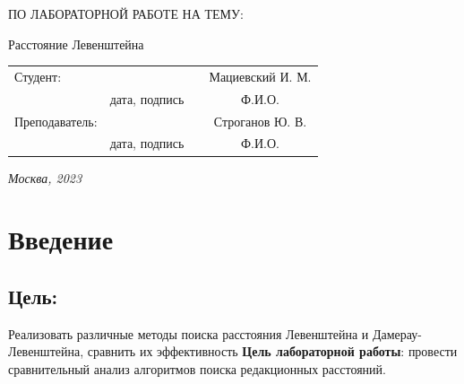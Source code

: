 \documentclass[12pt, a4paper]{article}
\begin{document}
\begin{titlepage}
\begin{center}
\begin{bf}
    \fontsize{20}{30}\selectfont
    ПО ЛАБОРАТОРНОЙ РАБОТЕ НА ТЕМУ:

    Расстояние Левенштейна

   \end{bf}
  \end{center}

  \fontsize{14}{21}\selectfont
  \vspace{5cm}


  \noindent\begin{tabularx}{\textwidth}{ X >{\centering}p{4cm} p{1cm} c }
   Студент: & & & Мациевский И. М. \\ \cline{2-2} \cline{4-4}
   & \fontsize{10}{15}\selectfont дата, подпись & & \fontsize{10}{15}\selectfont Ф.И.О. \\
   Преподаватель: & & & Строганов Ю. В.\\ \cline{2-2} \cline{4-4}
   & \fontsize{10}{15}\selectfont дата, подпись & & \fontsize{10}{15}\selectfont Ф.И.О.
   \end{tabularx}

  \vspace{\fill}

  \begin{center}
   \it{Москва}, 2023
  \end{center}

  \thispagestyle{empty}
\end{titlepage}\newpage
\tableofcontents
\newpage
\section{Введение}
\subsection{Цель:}
Реализовать различные методы поиска расстояния
Левенштейна и  Дамерау-Левенштейна, сравнить их
эффективность
\textbf{Цель лабораторной работы}: провести сравнительный анализ алгоритмов поиска редакционных расстояний.
\end{document}
